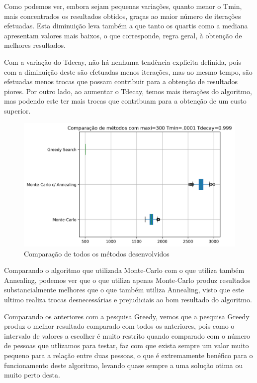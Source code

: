 \documentclass[a4paper]{report}
\begin{document}
\pagebreak
Como podemos ver, embora sejam pequenas variações, quanto
menor o Tmin, mais concentrados os resultados obtidos, graças ao maior número de
iterações efetuadas. Esta diminuição leva também a que tanto os quartis como a
mediana apresentam valores mais baixos, o que corresponde, regra geral, à obtenção de
melhores resultados.

Com a variação do Tdecay, não há nenhuma tendência explicita definida, pois com
a diminuição deste são efetuadas menos iterações, mas ao mesmo tempo, são
efetuadas menos trocas que possam contribuir para a obtenção de resultados
piores. Por outro lado, ao aumentar o Tdecay, temos mais iterações do
algoritmo, mas podendo este ter mais trocas que contribuam para a obtenção de um
custo superior.

\pagebreak
\begin{figure}[h]
    \centering
        \includegraphics[width=\textwidth]{images/graph_comp_all_algorithms.png}
        \caption{Comparação de todos os métodos desenvolvidos}
\end{figure}

Comparando o algoritmo que utilizada Monte-Carlo com o que utiliza também
Annealing, podemos ver que o que utiliza apenas Monte-Carlo produz resultados
substancialmente melhores que o que também utiliza Annealing, visto que este
ultimo realiza trocas desnecessárias e prejudiciais ao bom resultado do
algoritmo.

Comparando os anteriores com a pesquisa Greedy, vemos que a pesquisa Greedy
produz o melhor resultado comparado com todos os anteriores, pois como o
intervalo de valores a escolher é muito restrito quando comparado com o número
de pessoas que utlizamos para testar, faz com que exista sempre um valor muito
pequeno para a relação entre duas pessoas, o que é extremamente benéfico para o
funcionamento deste algoritmo, levando quase sempre a uma solução otima ou muito
perto desta.
\end{document}
